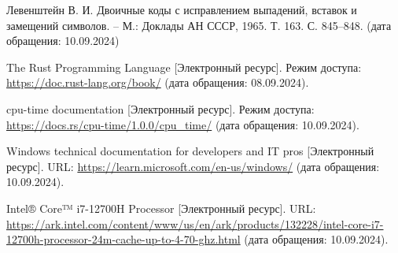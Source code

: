 
\renewcommand\bibname{Список использованных источников}
\begin{thebibliography}{5}
    Левенштейн В. И. Двоичные коды с исправлением выпадений, вставок и замещений символов. – М.: Доклады АН СССР, 1965. Т. 163. С. 845–848. (дата обращения: 10.09.2024)
    
    The Rust Programming Language [Электронный ресурс]. Режим доступа: \url{https://doc.rust-lang.org/book/} (дата обращения: 08.09.2024).
    
    cpu-time documentation [Электронный ресурс]. Режим доступа: \url{https://docs.rs/cpu-time/1.0.0/cpu_time/} (дата обращения: 10.09.2024).
    
    Windows technical documentation for developers and IT pros [Электронный ресурс]. URL: \url{https://learn.microsoft.com/en-us/windows/} (дата обращения: 10.09.2024).
    
    Intel® Core™ i7-12700H Processor [Электронный ресурс]. URL: \url{https://ark.intel.com/content/www/us/en/ark/products/132228/intel-core-i7-12700h-processor-24m-cache-up-to-4-70-ghz.html} (дата обращения: 10.09.2024).
\end{thebibliography}
